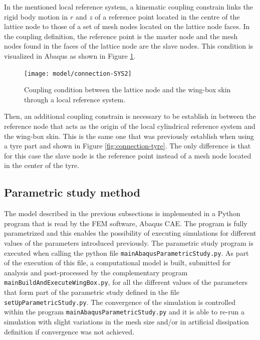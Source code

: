     In the mentioned local reference system, a kinematic coupling constrain links the rigid body motion in $r$ and $z$ of a reference point located in the centre of the lattice node to those of a set of mesh nodes located on the lattice node faces. In the coupling definition, the reference point is the master node and the mesh nodes found in the faces of the lattice node are the slave nodes. This condition is visualized in Abaqus as shown in Figure \ref{fig:connection-localSYS2}.

    \begin{figure}[!htpb]
      \centering
      \texttt{[image: model/connection-SYS2]}
      \caption[Coupling condition between the lattice node and the wing-box skin through a local reference system]{Coupling condition between the lattice node and the wing-box skin through a local reference system. }\label{fig:connection-localSYS2}
    \end{figure}

    Then, an additional coupling constrain is necessary to be establish in between the reference node that acts as the origin of the local cylindrical reference system and the wing-box skin. This is the same one that was previously establish when using a tyre part and shown in Figure \ref{fig:connection-tyre}. The only difference is that for this case the slave node is the reference point instead of a mesh node located in the center of the tyre.

  \clearpage
  \subsection{Parametric study method} \label{subsec:parametricStudy_computationalModel}

    The model described in the previous subsections is implemented in a Python program that is read by the FEM software, Abaqus CAE. The program is fully parametrized and this enables the possibility of executing simulations for different values of the parameters introduced previously. The parametric study program is executed when calling the python file \texttt{mainAbaqusParametricStudy.py}. As part of the execution of this file, a computational model is built, submitted for analysis and post-processed by the complementary program \texttt{mainBuildAndExecuteWingBox.py}, for all the different values of the parameters that form part of the parametric study defined in the file \texttt{setUpParametricStudy.py}. The convergence of the simulation is controlled within the program \texttt{mainAbaqusParametricStudy.py} and it is able to re-run a simulation with slight variations in the mesh size and/or in artificial dissipation definition if convergence was not achieved.

